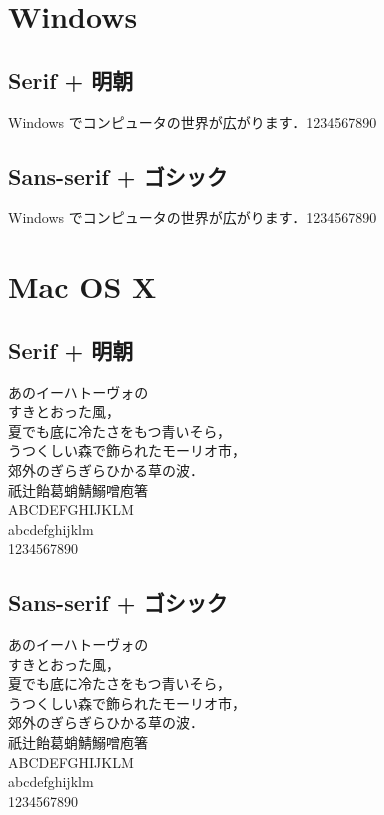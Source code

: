 ﻿\documentclass[a4paper,12pt]{ujreport}
\begin{document}

\chapter*{Windows}

\section*{Serif + 明朝}
\begin{center}
Windows でコンピュータの世界が広がります．1234567890
\end{center}

\section*{Sans-serif + ゴシック}
\begin{center}
\sffamily\gtfamily
Windows でコンピュータの世界が広がります．1234567890
\end{center}


\chapter*{Mac OS X}

\section*{Serif + 明朝}
\begin{center}
あのイーハトーヴォの \\
すきとおった風， \\
夏でも底に冷たさをもつ青いそら， \\
うつくしい森で飾られたモーリオ市， \\
郊外のぎらぎらひかる草の波． \\
祇辻飴葛蛸鯖鰯噌庖箸 \\
ABCDEFGHIJKLM \\
abcdefghijklm \\
1234567890 \\
\end{center}

\section*{Sans-serif + ゴシック}
\begin{center}
\sffamily\gtfamily
あのイーハトーヴォの \\
すきとおった風， \\
夏でも底に冷たさをもつ青いそら， \\
うつくしい森で飾られたモーリオ市， \\
郊外のぎらぎらひかる草の波． \\
祇辻飴葛蛸鯖鰯噌庖箸 \\
ABCDEFGHIJKLM \\
abcdefghijklm \\
1234567890 \\
\end{center}

\end{document}
